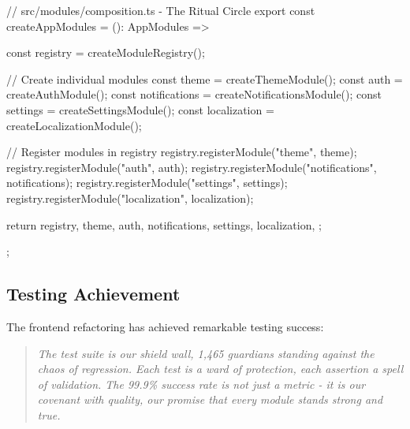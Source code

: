 \documentclass[11pt]{article}
\begin{document}
\begin{typescriptcode}
// src/modules/composition.ts - The Ritual Circle
export const createAppModules = (): AppModules => {
    const registry = createModuleRegistry();
    
    // Create individual modules
    const theme = createThemeModule();
    const auth = createAuthModule();
    const notifications = createNotificationsModule();
    const settings = createSettingsModule();
    const localization = createLocalizationModule();

    // Register modules in registry
    registry.registerModule("theme", theme);
    registry.registerModule("auth", auth);
    registry.registerModule("notifications", notifications);
    registry.registerModule("settings", settings);
    registry.registerModule("localization", localization);

    return {
        registry,
        theme,
        auth,
        notifications,
        settings,
        localization,
    };
};
\end{typescriptcode}

\subsection{Testing Achievement}

The frontend refactoring has achieved remarkable testing success:

\begin{quote}
\emph{The test suite is our shield wall, 1,465 guardians standing against the chaos of regression. Each test is a ward of protection, each assertion a spell of validation. The 99.9\% success rate is not just a metric - it is our covenant with quality, our promise that every module stands strong and true.}
\end{quote}
\end{document}
